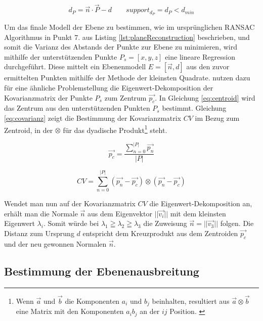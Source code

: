 \begin{equation} \label{eq:plane-distance}
d_P = \vec{n} \cdot \vec{P} - d \qquad support_{d_P} = d_P < d_{min}
\end{equation}

Um das finale Modell der Ebene zu bestimmen, wie im ursprünglichen RANSAC Algorithmus in Punkt 7. aus Listing \ref{lst:planeReconstruction} beschrieben, und somit die Varianz des Abstands der Punkte zur Ebene zu minimieren, wird mithilfe der unterstützenden Punkte \(P_{s}=\left[x,y,z\right]\) eine lineare Regression durchgeführt. Diese mittelt ein Ebenenmodell \(E=\left[\vec{n}, d\right]\) aus den zuvor ermittelten Punkten mithilfe der Methode der kleinsten Quadrate. \citet{hoppe1992surface} nutzen dazu für eine ähnliche Problemstellung die Eigenwert-Dekomposition der Kovarianzmatrix der Punkte \(P_{s}\) zum Zentrum \(\vec{p_{c}}\). In Gleichung \ref{eq:centroid} wird das Zentrum aus den unterstützenden Punkten \(P_{s}\) bestimmt. Gleichung \ref{eq:covarianz} zeigt die Bestimmung der Kovarianzmatrix \(CV\) im Bezug zum Zentroid, in der \(\otimes\) für das dyadische Produkt\footnote{Wenn \(\vec{a}\) und \(\vec{b}\) die Komponenten \(a_i\) und \(b_j\) beinhalten, resultiert aus \(\vec{a} \otimes \vec{b}\) eine Matrix mit den Komponenten \(a_ib_j\) an der \(ij\) Position. \citep{hoppe1992surface}} steht.

\begin{equation} \label{eq:centroid}
\vec{p_{c}} = \frac{\sum_{n=0}^{|P|} \vec{p_{n}}}{|P|}
\end{equation}

\begin{equation} \label{eq:covarianz}
CV = \sum_{n=0}^{|P|} ( \vec{p_{n}}- \vec{p_{c}}) \otimes ( \vec{p_{n}}- \vec{p_{c}})
\end{equation}

Wendet man nun auf der Kovarianzmatrix \(CV\) die Eigenwert-Dekomposition an, erhält man die Normale \(\vec{n}\) aus dem Eigenvektor \(||\vec{v_i}||\) mit dem kleinsten Eigenwert \(\lambda_i\). Somit würde bei \(\lambda_1 \geqq \lambda_2 \geqq \lambda_3\) die Zuweisung \(\vec{n} = ||\vec{v_3}||\) folgen. Die Distanz zum Ursprung \(d\) entspricht dem Kreuzprodukt aus dem Zentroiden \(\vec{p_c}\) und der neu gewonnen Normalen \(\vec{n}\). \citep{hoppe1992surface} 

\subsection{Bestimmung der Ebenenausbreitung}

